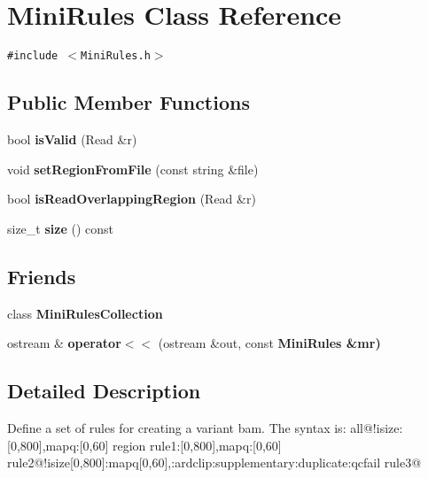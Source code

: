 \section{Mini\-Rules Class Reference}
\label{classMiniRules}
{\tt \#include $<$Mini\-Rules.h$>$}

\subsection*{Public Member Functions}
\begin{CompactItemize}
\item 
bool \textbf{is\-Valid} (Read \&r)\label{classMiniRules_bb41521aecc3b9a06435b9ca30f13263}

\item 
void \textbf{set\-Region\-From\-File} (const string \&file)\label{classMiniRules_86dfcf6341a058f0a80cf7820c8bbb3b}

\item 
bool \textbf{is\-Read\-Overlapping\-Region} (Read \&r)\label{classMiniRules_630d29da8c7a301306f1453ca4edfd46}

\item 
size\_\-t \textbf{size} () const \label{classMiniRules_dbbcd299c7a5300ca5342628abd3ada1}

\end{CompactItemize}
\subsection*{Friends}
\begin{CompactItemize}
\item 
class \textbf{Mini\-Rules\-Collection}\label{classMiniRules_0096f479fba63a9279b4563f1035fbda}

\item 
ostream \& \textbf{operator$<$$<$} (ostream \&out, const \bf{Mini\-Rules} \&mr)\label{classMiniRules_b5b68bfffca996f88c023a51410e47fd}

\end{CompactItemize}


\subsection{Detailed Description}
Define a set of rules for creating a variant bam. The syntax is: all@!isize:[0,800],mapq:[0,60] region rule1:[0,800],mapq:[0,60] rule2@!isize[0,800]:mapq[0,60],:ardclip:supplementary:duplicate:qcfail rule3@

